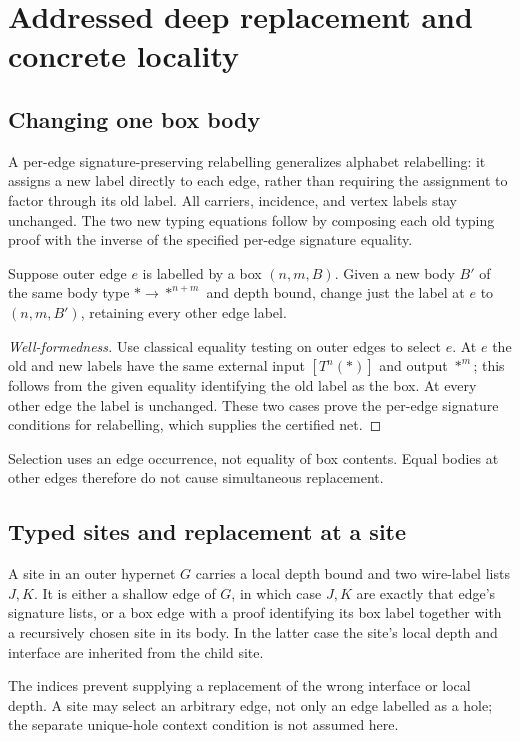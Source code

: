 \section{Addressed deep replacement and concrete locality}
\subsection{Changing one box body}
A per-edge signature-preserving relabelling generalizes alphabet relabelling:
it assigns a new label directly to each edge, rather than requiring the assignment
to factor through its old label. All carriers, incidence, and vertex labels stay
unchanged. The two new typing equations follow by composing each old typing
proof with the inverse of the specified per-edge signature equality.

\begin{definition}\label{term:box-replacement}
Suppose outer edge $e$ is labelled by a box $(n,m,B)$. Given a new body $B'$ of
the same body type $*\to *^{n+m}$ and depth bound, change just the label at $e$
to $(n,m,B')$, retaining every other edge label.
\end{definition}
\begin{proof}[Well-formedness]
Use classical equality testing on outer edges to select $e$. At $e$ the old and
new labels have the same external input $[T^n(*)]$ and output $*^m$; this follows
from the given equality identifying the old label as the box. At every other
edge the label is unchanged. These two cases prove the per-edge signature
conditions for relabelling, which supplies the certified net.
\end{proof}
Selection uses an edge occurrence, not equality of box contents. Equal bodies
at other edges therefore do not cause simultaneous replacement.

\subsection{Typed sites and replacement at a site}
\begin{definition}[Site]\label{term:site}
A site in an outer hypernet $G$ carries a local depth bound and two wire-label
lists $J,K$. It is either a shallow edge of $G$, in which case $J,K$ are exactly
that edge's signature lists, or a box edge with a proof identifying its box
label together with a recursively chosen site in its body. In the latter case
the site's local depth and interface are inherited from the child site.
\end{definition}
The indices prevent supplying a replacement of the wrong interface or local
depth. A site may select an arbitrary edge, not only an edge labelled as a hole;
the separate unique-hole context condition is not assumed here.

